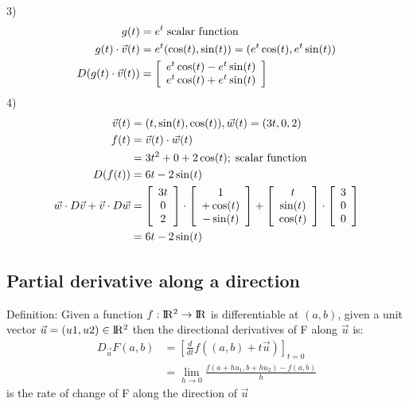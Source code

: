 \documentclass{article}
\newcommand{\R}{\rm I\!R}
\begin{document}
        3)
        \begin{align}
            g(t) &= e^t\text{\;scalar function}\\
            g(t)\cdot\vec{v}(t) &= e^t(\cos(t),\sin(t)) = (e^t\cos(t),e^t\sin(t))\\
            D(g(t)\cdot\vec{v}(t)) &=    \left[\begin{array}{c}
                                            e^t\cos(t)-e^t\sin(t)\\
                                            e^t\cos(t)+e^t\sin(t)
                                        \end{array}\right]
        \end{align}
        4)
        \begin{align}
            \vec{v}(t) &= (t,\sin(t),\cos(t)), \vec{w}(t) = (3t,0,2)\\
            f(t) &= \vec{v}(t)\cdot\vec{w}(t)\nonumber\\
                 &= 3t^2+0+2\cos(t);\text{\;scalar function}\\
            D(f(t)) &= 6t-2\sin(t)\\
            \vec{w}\cdot D\vec{v} + \vec{v}\cdot D\vec{w} &=
            \left[\begin{array}{c} 3t\\0\\2\end{array}\right]
            \cdot\left[\begin{array}{c} 1\\+\cos(t)\\-\sin(t)\end{array}\right] + 
            \left[\begin{array}{c} t\\\sin(t)\\\cos(t)\end{array}\right]
            \cdot\left[\begin{array}{c} 3\\0\\0\end{array}\right]\\
            &=6t-2\sin(t)
        \end{align}
    \subsection{Partial derivative along a direction}
        Definition: Given a function $f:\R^2\rightarrow\R$ is differentiable at $(a,b)$, given a unit vector $\vec{u} = (u1,u2)\in\R^2$ then the directional derivatives of F along $\vec{u}$ is:
        \begin{align}
            D_{\vec{u}}F(a,b) &= \left[\frac{d}{dt}f((a,b)+t\vec{u})\right]_{t=0}\\
            &= \lim_{h\rightarrow 0}{\frac{f(a+hu_1,b+hu_2)-f(a,b)}{h}}
        \end{align}
        is the rate of change of F along the direction of $\vec{u}$
        
\end{document}
